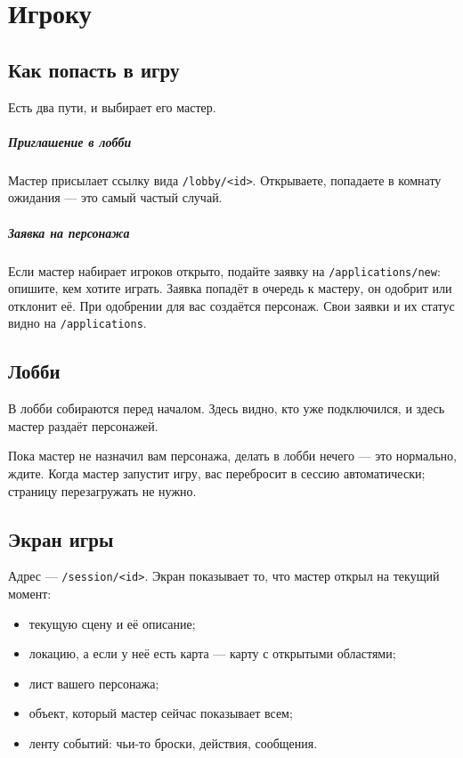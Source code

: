 \chapter{Игроку}
\label{ch:player}

\section{Как попасть в игру}
\label{sec:player:join}

Есть два пути, и выбирает его мастер.

\paragraph{Приглашение в лобби}
Мастер присылает ссылку вида \texttt{/lobby/<id>}. Открываете, попадаете в комнату ожидания --- это самый частый случай.

\paragraph{Заявка на персонажа}
Если мастер набирает игроков открыто, подайте заявку на \texttt{/applications/new}: опишите, кем хотите играть. Заявка попадёт в очередь к мастеру, он одобрит или отклонит её. При одобрении для вас создаётся персонаж. Свои заявки и их статус видно на \texttt{/applications}.

\section{Лобби}
\label{sec:player:lobby}

В лобби собираются перед началом. Здесь видно, кто уже подключился, и здесь мастер раздаёт персонажей.


Пока мастер не назначил вам персонажа, делать в лобби нечего --- это нормально, ждите. Когда мастер запустит игру, вас перебросит в сессию автоматически; страницу перезагружать не нужно.

\section{Экран игры}
\label{sec:player:session}

Адрес --- \texttt{/session/<id>}. Экран показывает то, что мастер открыл на текущий момент:

\begin{itemize}
\item текущую сцену и её описание;
\item локацию, а если у неё есть карта --- карту с открытыми областями;
\item лист вашего персонажа;
\item объект, который мастер сейчас показывает всем;
\item ленту событий: чьи-то броски, действия, сообщения.
\end{itemize}

